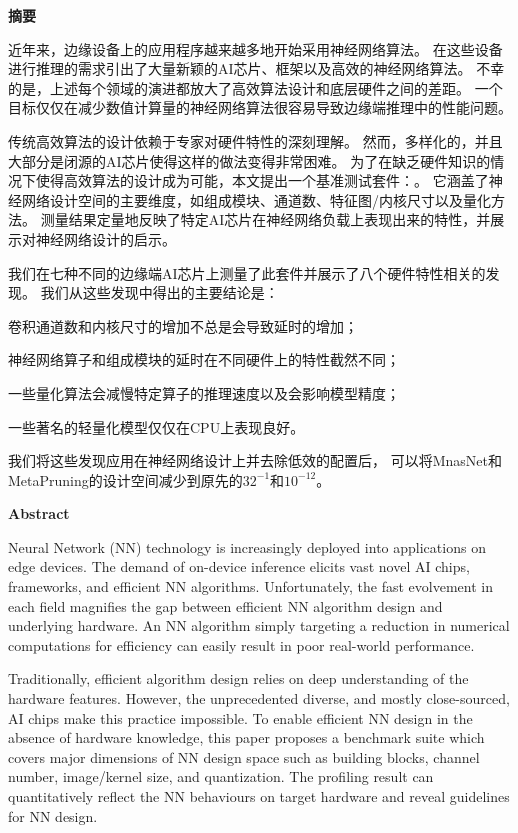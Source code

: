 \cleardoublepage{}
\begin{center}
    \bfseries {} 摘要
\end{center}
近年来，边缘设备上的应用程序越来越多地开始采用神经网络算法。
在这些设备进行推理的需求引出了大量新颖的AI芯片、框架以及高效的神经网络算法。
不幸的是，上述每个领域的演进都放大了高效算法设计和底层硬件之间的差距。
一个目标仅仅在减少数值计算量的神经网络算法很容易导致边缘端推理中的性能问题。

传统高效算法的设计依赖于专家对硬件特性的深刻理解。
然而，多样化的，并且大部分是闭源的AI芯片使得这样的做法变得非常困难。
为了在缺乏硬件知识的情况下使得高效算法的设计成为可能，本文提出一个基准测试套件：\sysname。
它涵盖了神经网络设计空间的主要维度，如组成模块、通道数、特征图/内核尺寸以及量化方法。
测量结果定量地反映了特定AI芯片在神经网络负载上表现出来的特性，并展示对神经网络设计的启示。

我们在七种不同的边缘端AI芯片上测量了此套件并展示了八个硬件特性相关的发现。
我们从这些发现中得出的主要结论是：
\begin{enumerate*}
    \item 卷积通道数和内核尺寸的增加不总是会导致延时的增加；
    \item 神经网络算子和组成模块的延时在不同硬件上的特性截然不同；
    \item 一些量化算法会减慢特定算子的推理速度以及会影响模型精度；
    \item 一些著名的轻量化模型仅仅在CPU上表现良好。
\end{enumerate*}

我们将这些发现应用在神经网络设计上并去除低效的配置后，
可以将MnasNet和MetaPruning的设计空间减少到原先的$32^{-1}$和$10^{-12}$。

\cleardoublepage{}
\begin{center}
    \bfseries {} Abstract
\end{center}
Neural Network (NN) technology is increasingly deployed
into applications on edge devices. The demand of on-device
inference elicits vast novel AI chips, frameworks, and efficient NN algorithms.
Unfortunately, the fast evolvement in
each field magnifies the gap between efficient NN algorithm
design and underlying hardware. An NN algorithm simply
targeting a reduction in numerical computations for efficiency
can easily result in poor real-world performance.

Traditionally, efficient algorithm design relies on deep understanding of the hardware features. 
However, the unprecedented diverse, and mostly close-sourced, AI chips make
this practice impossible. To enable efficient NN design in
the absence of hardware knowledge, this paper proposes a
benchmark suite \sysname which covers major dimensions
of NN design space such as building blocks, channel number,
image/kernel size, and quantization. The profiling result can
quantitatively reflect the NN behaviours on target
hardware and reveal guidelines for NN design.

